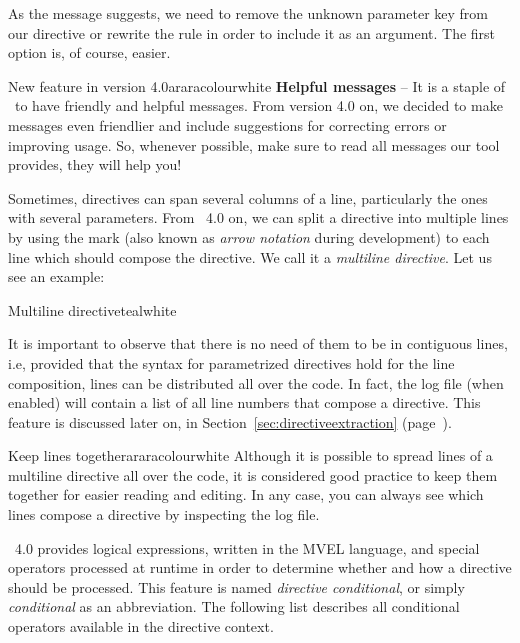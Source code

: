 As the message suggests, we need to remove the unknown parameter key from our directive or rewrite the rule in order to include it as an argument. The first option is, of course, easier.

\begin{messagebox}{New feature in version 4.0}{araracolour}{\icinfo}{white}
\textbf{Helpful messages} -- It is a staple of \arara\ to have friendly and helpful messages. From version 4.0 on, we decided to make messages even friendlier and include suggestions for correcting errors or improving usage. So, whenever possible, make sure to read all messages our tool provides, they will help you!
\end{messagebox}

Sometimes, directives can span several columns of a line, particularly the ones with several parameters. From \arara\ 4.0 on, we can split a directive into multiple lines by using the  mark (also known as \emph{arrow notation} during development) to each line which should compose the directive. We call it a \emph{multiline directive}. Let us see an example:

\begin{codebox}{Multiline directive}{teal}{\icnote}{white}
\end{codebox}

It is important to observe that there is no need of them to be in contiguous lines, i.e, provided that the syntax for parametrized directives hold for the line composition, lines can be distributed all over the code. In fact, the log file (when enabled) will contain a list of all line numbers that compose a directive. This feature is discussed later on, in Section~\ref{sec:directiveextraction} (page~\pageref{sec:directiveextraction}).

\begin{messagebox}{Keep lines together}{araracolour}{\icinfo}{white}
Although it is possible to spread lines of a multiline directive all over the code, it is considered good practice to keep them together for easier reading and editing. In any case, you can always see which lines compose a directive by inspecting the log file.
\end{messagebox}

\arara\ 4.0 provides logical expressions, written in the MVEL language, and special operators processed at runtime in order to determine whether and how a directive should be processed. This feature is named \emph{directive conditional}, or simply \emph{conditional} as an abbreviation. The following list describes all conditional operators available in the directive context.

